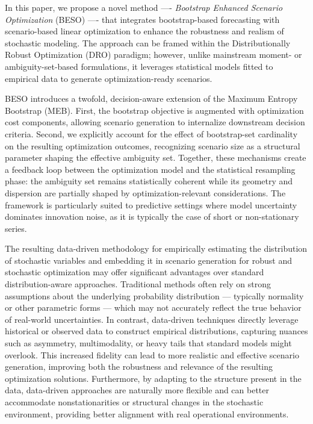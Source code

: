 \documentclass[mnsc,sglanonrev]{informs4}  %
\theoremstyle{remark}\newtheorem{remark}{Remark}
\begin{document}
In this paper, we propose a novel method —- {\em Bootstrap Enhanced Scenario Optimization} (BESO) —- that integrates bootstrap-based forecasting with scenario-based linear optimization to enhance the robustness and realism of stochastic modeling. The approach can be framed within the Distributionally Robust Optimization (DRO) paradigm; however, unlike mainstream moment- or ambiguity-set-based formulations, it leverages statistical models fitted to empirical data to generate optimization-ready scenarios.

BESO introduces a twofold, decision-aware extension of the Maximum Entropy Bootstrap (MEB). First, the bootstrap objective is augmented with optimization cost components, allowing scenario generation to internalize downstream decision criteria. Second, we explicitly account for the effect of bootstrap-set cardinality on the resulting optimization outcomes, recognizing scenario size as a structural parameter shaping the effective ambiguity set. Together, these mechanisms create a feedback loop between the optimization model and the statistical resampling phase: the ambiguity set remains statistically coherent while its geometry and dispersion are partially shaped by optimization-relevant considerations. The framework is particularly suited to predictive settings where model uncertainty dominates innovation noise, as it is typically the case of short or non-stationary series.

The resulting data-driven methodology for empirically estimating the distribution of stochastic variables and embedding it in scenario generation for robust and stochastic optimization may offer significant advantages over standard distribution-aware approaches. Traditional methods often rely on strong assumptions about the underlying probability distribution — typically normality or other parametric forms — which may not accurately reflect the true behavior of real-world uncertainties. In contrast, data-driven techniques directly leverage historical or observed data to construct empirical distributions, capturing nuances such as asymmetry, multimodality, or heavy tails that standard models might overlook. This increased fidelity can lead to more realistic and effective scenario generation, improving both the robustness and relevance of the resulting optimization solutions. Furthermore, by adapting to the structure present in the data, data-driven approaches are naturally more flexible and can better accommodate nonstationarities or structural changes in the stochastic environment, providing better alignment with real operational environments.
\end{document}
